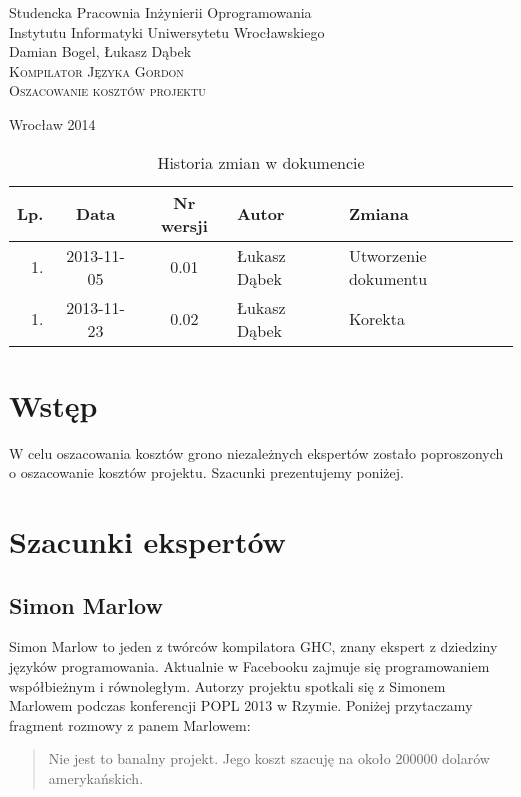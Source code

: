 \documentclass{documentation}
\begin{document}
\begin{titlepage}
\begin{center}
Studencka Pracownia Inżynierii Oprogramowania\\
Instytutu Informatyki Uniwersytetu Wrocławskiego\\[6cm]

Damian Bogel, Łukasz Dąbek\\[1cm]
\textsc{\LARGE Kompilator Języka Gordon}\\[0.5cm]
\textsc{\large Oszacowanie kosztów projektu}

\vfill
Wrocław 2014 \\[2.5cm]

\end{center}
\end{titlepage}

\newpage
\begin{table}
	\centering
    \captionsetup{name=Tabela}
	\caption{Historia zmian w dokumencie}
		\begin{tabular}{|r|c|c|l|l|}
		\hline
		Lp.  & Data       & Nr wersji & Autor                 & Zmiana \\ \hline
		1.   & 2013-11-05 & 0.01 & Łukasz Dąbek & Utworzenie dokumentu \\ \hline
		1.   & 2013-11-23 & 0.02 & Łukasz Dąbek & Korekta             \\ \hline
	\end{tabular}
\end{table}
\newpage

\tableofcontents
\setcounter{page}{2}

\newpage

\section{Wstęp}
\noindent W celu oszacowania kosztów grono niezależnych ekspertów zostało poproszonych
o oszacowanie kosztów projektu. Szacunki prezentujemy poniżej.

\section{Szacunki ekspertów}
\subsection{Simon Marlow}
\noindent Simon Marlow to jeden z twórców kompilatora \textsc{GHC}, znany ekspert
z dziedziny języków programowania. Aktualnie w Facebooku zajmuje się programowaniem
współbieżnym i równoległym. Autorzy projektu spotkali się z Simonem Marlowem podczas
konferencji POPL 2013 w Rzymie. Poniżej przytaczamy fragment rozmowy z panem Marlowem:
\begin{quotation}
    Nie jest to banalny projekt. Jego koszt szacuję na około 200000 dolarów amerykańskich.
\end{quotation}
\end{document}
